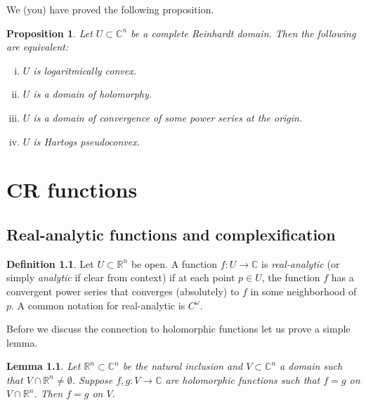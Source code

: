 \documentclass[12pt,openany]{book}
\newcommand{\C}{{\mathbb{C}}}
\newcommand{\R}{{\mathbb{R}}}
\newcommand{\myindex}[1]{#1\index{#1}}
\theoremstyle{plain}
\newtheorem{lemma}[thm]{Lemma}
\newtheorem{prop}[thm]{Proposition}
\theoremstyle{remark}
\theoremstyle{definition}
\newtheorem{defn}[thm]{Definition}
\theoremstyle{exercise}
\theoremstyle{example}
\begin{document}
\pagebreak[2]
We (you) have proved the following proposition.

\pagebreak[2]
\begin{prop}
Let $U \subset \C^n$ be a complete Reinhardt domain.  Then the following are
equivalent:
\begin{enumerate}[(i)]
\item
$U$ is logaritmically convex.
\item
$U$ is a domain of holomorphy.
\item
$U$ is a domain of convergence of some power series at the origin.
\item
$U$ is Hartogs pseudoconvex.
\end{enumerate}
\end{prop}


\chapter{CR functions} \label{ch:crfunctions}


\section{Real-analytic functions and complexification}

\begin{defn}
Let $U \subset \R^n$ be open.
A function $f \colon U \to \C$ is 
\emph{\myindex{real-analytic}} (or simply \emph{analytic} if
clear from context) if at each point $p \in U$, the function $f$
has a convergent power series that converges (absolutely) to $f$ in some
neighborhood of $p$.
%
A common notation for real-analytic is $C^\omega$.
\end{defn}

Before we discuss the connection to holomorphic functions let us prove a simple
lemma.

\begin{lemma}
Let $\R^n \subset \C^n$ be the natural inclusion and 
$V \subset \C^n$ a domain such that $V \cap \R^n \not= \emptyset$.
Suppose $f,g \colon V \to \C$ are holomorphic functions such that
$f=g$ on $V \cap \R^n$.  Then $f=g$ on $V$.
\end{lemma}
\end{document}

